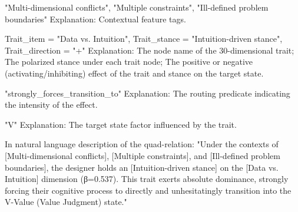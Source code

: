 \documentclass[11pt]{article}
\begin{document}
\begin{tcolorbox}[
    title = {Situational\_Context: },
    colframe = black!70,
    colbacktitle = black!70,
    coltitle = white,
    colback = white,
    fonttitle = \bfseries,
    center title,
    nobeforeafter,
    boxrule = 0.5pt,
    title filled,
    segmentation style = dashed,
]
"Multi-dimensional conflicts", "Multiple constraints", "Ill-defined problem boundaries"
\tcblower
Explanation: Contextual feature tags.
\end{tcolorbox}

\begin{tcolorbox}[
    title = {Trait: },
    colframe = black!70,
    colbacktitle = black!70,
    coltitle = white,
    colback = white,
    fonttitle = \bfseries,
    center title,
    nobeforeafter,
    boxrule = 0.5pt,
    title filled,
    segmentation style = dashed,
]
Trait\_item = "Data vs. Intuition", Trait\_stance = "Intuition-driven stance", Trait\_direction = "+" 
\tcblower
Explanation: The node name of the 30-dimensional trait; The polarized stance under each trait node; The positive or negative (activating/inhibiting) effect of the trait and stance on the target state.
\end{tcolorbox}

\begin{tcolorbox}[
    title = {Predicate: },
    colframe = black!70,
    colbacktitle = black!70,
    coltitle = white,
    colback = white,
    fonttitle = \bfseries,
    center title,
    nobeforeafter,
    boxrule = 0.5pt,
    title filled,
    segmentation style = dashed,
]
"strongly\_forces\_transition\_to"
\tcblower
Explanation: The routing predicate indicating the intensity of the effect.
\end{tcolorbox}

\begin{tcolorbox}[
    title = {State: },
    colframe = black!70,
    colbacktitle = black!70,
    coltitle = white,
    colback = white,
    fonttitle = \bfseries,
    center title,
    nobeforeafter,
    boxrule = 0.5pt,
    title filled,
    segmentation style = dashed,
]
"V"
\tcblower
Explanation: The target state factor influenced by the trait.
\end{tcolorbox}

In natural language description of the quad-relation: "Under the contexts of [Multi-dimensional conflicts], [Multiple constraints], and [Ill-defined problem boundaries], the designer holds an [Intuition-driven stance] on the [Data vs. Intuition] dimension (β=0.537). This trait exerts absolute dominance, strongly forcing their cognitive process to directly and unhesitatingly transition into the V-Value (Value Judgment) state."
\end{document}
